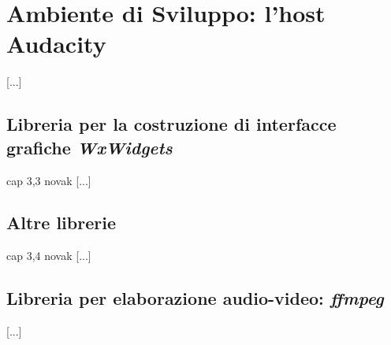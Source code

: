 \chapter{Ambiente di Sviluppo: l'host Audacity}
\label{sec:audacity}
[...]\\



\section{Libreria per la costruzione di interfacce grafiche \emph{WxWidgets}}
\label{sec:GUI}
	
	cap 3,3 novak
	[...]\\
	
	
\section{Altre librerie}
\label{sec:libs}
	cap 3,4 novak
	[...]\\
	
	
\section{Libreria per elaborazione audio-video: \emph{ffmpeg}}
\label{sec:}
	[...]\\